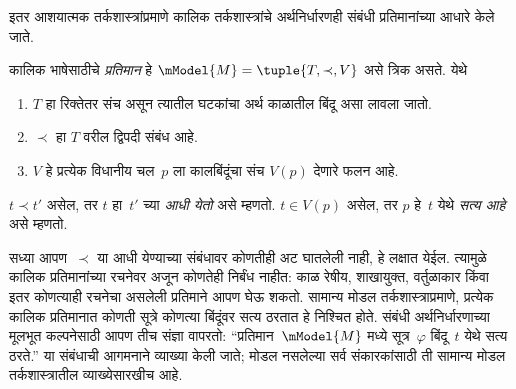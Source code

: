 इतर आशयात्मक तर्कशास्त्रांप्रमाणे कालिक तर्कशास्त्रांचे
अर्थनिर्धारणही संबंधी प्रतिमानांच्या आधारे केले जाते.
\begin{defn}
  कालिक भाषेसाठीचे \emph{प्रतिमान} हे
  $\mModel{M} = \tuple{T, \prec, V}$ असे त्रिक असते. येथे
  \begin{enumerate}
  \item $T$ हा रिक्तेतर संच असून त्यातील घटकांचा अर्थ
    काळातील बिंदू असा लावला जातो.
  \item $\prec$ हा $T$ वरील द्विपदी संबंध आहे.
  \item $V$ हे प्रत्येक विधानीय चल~$p$ ला कालबिंदूंचा संच $V(p)$ देणारे फलन आहे.
  \end{enumerate}
  $t \prec t'$ असेल, तर $t$ हा~$t'$ च्या \emph{आधी येतो}
  असे म्हणतो. $t \in V(p)$ असेल, तर $p$ हे~$t$ येथे
  \emph{सत्य आहे} असे म्हणतो.
\end{defn}
सध्या आपण~$\prec$ या आधी येण्याच्या संबंधावर कोणतीही अट
घातलेली नाही, हे लक्षात येईल. त्यामुळे कालिक
प्रतिमानांच्या रचनेवर अजून कोणतेही निर्बंध नाहीत:
काळ रेषीय, शाखायुक्त, वर्तुळाकार किंवा इतर
कोणत्याही रचनेचा असलेली प्रतिमाने आपण घेऊ शकतो.
सामान्य मोडल तर्कशास्त्राप्रमाणे, प्रत्येक कालिक
प्रतिमानात कोणती सूत्रे कोणत्या बिंदूंवर
सत्य ठरतात हे निश्चित होते. संबंधी अर्थनिर्धारणाच्या
मूलभूत कल्पनेसाठी आपण तीच संज्ञा वापरतो:
``प्रतिमान~$\mModel{M}$ मध्ये सूत्र~$\varphi$
बिंदू~$t$ येथे सत्य ठरते.'' या संबंधाची आगमनाने
व्याख्या केली जाते; मोडल नसलेल्या सर्व संकारकांसाठी
ती सामान्य मोडल तर्कशास्त्रातील व्याख्येसारखीच आहे.
